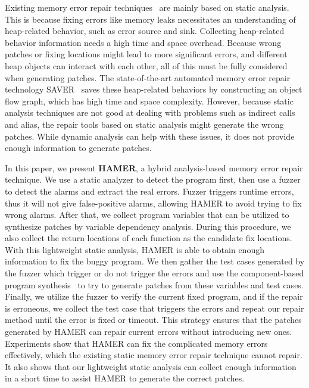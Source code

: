 \documentclass[a4paper,11pt,oneside,openany]{book}
\begin{document}
Existing memory error repair techniques~\cite{SAVER,Memfix} are mainly based on static analysis. This is because fixing errors like memory leaks necessitates an understanding of heap-related behavior, such as error source and sink. Collecting heap-related behavior information needs a high time and space overhead. Because wrong patches or fixing locations might lead to more significant errors, and different heap objects can interact with each other, all of this must be fully considered when generating patches. The state-of-the-art automated memory error repair technology SAVER~\cite{SAVER} saves these heap-related behaviors by constructing an object flow graph, which has high time and space complexity. However, because static analysis techniques are not good at dealing with problems such as indirect calls and alias, the repair tools based on static analysis might generate the wrong patches. While dynamic analysis can help with these issues, it does not provide enough information to generate patches.

In this paper, we present \textbf{HAMER}, a hybrid analysis-based memory error repair \mbox{technique}. We use a static analyzer to detect the program first, then use a fuzzer to detect the alarms and extract the real errors. Fuzzer triggers runtime errors, thus it will not give false-positive alarms, allowing HAMER to avoid trying to fix wrong alarms. After that, we collect program variables that can be utilized to synthesize patches by variable dependency analysis. During this procedure, we also collect the return locations of each function as the candidate fix locations. With this lightweight static analysis, HAMER is able to obtain enough information to fix the buggy program. We then gather the test cases generated by the fuzzer which trigger or do not trigger the errors and use the component-based program synthesis~\cite{oracle} to try to generate patches from these variables and test cases. Finally, we utilize the fuzzer to verify the current fixed program, and if the repair is erroneous, we collect the test case that triggers the errors and repeat our repair method until the error is fixed or timeout. This strategy ensures that the patches generated by HAMER can repair current errors without introducing new ones.  Experiments show that HAMER can fix the complicated memory errors effectively, which the existing static memory error repair technique cannot repair. It also shows that our lightweight static analysis can collect enough information in a short time to assist HAMER to generate the correct patches.
\end{document}
